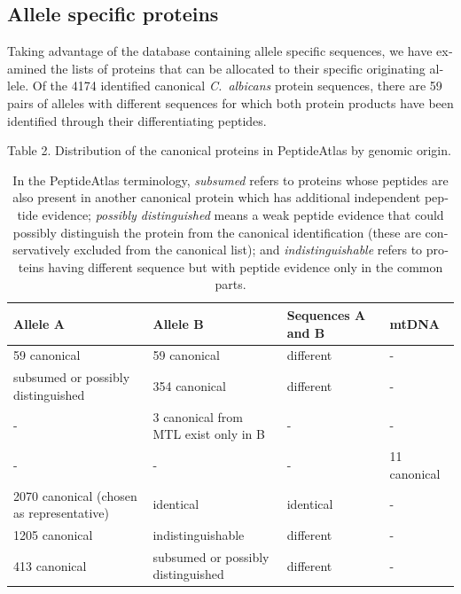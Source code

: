 \begin{otherlanguage}{british}
\subsection*{Allele specific proteins}

Taking advantage of the database containing allele specific sequences, we have examined
the lists of proteins that can be allocated to their specific originating allele.
Of the 4174 identified canonical \textit{\mbox{C. albicans}} protein sequences, there are 59 pairs of alleles
with different sequences for which both protein products have been identified through their
differentiating peptides.

\begin{table}[t]
\caption*{Table 2. Distribution of the canonical proteins in PeptideAtlas by genomic origin.}
\renewcommand{\arraystretch}{2}
\footnotesize
\centering
\begin{tabular}{p{2cm} p{2.5cm} p{2.5cm} p{2cm} }
\hline
Allele A  & Allele B & Sequences A and B & mtDNA \\
\hline
59 canonical & 59 canonical & different & -\\
subsumed or \newline possibly \mbox{distinguished} & 354 canonical & different & -\\
- & 3 canonical from MTL \newline exist only in B & - & -\\
- & - & - & 11 canonical \\
2070 canonical \newline (chosen as \newline \mbox{representative}) & identical & identical & - \\
1205 canonical & indistinguishable & different & - \\
413 canonical & subsumed or \newline possibly distinguished & different & - \\
\hline
\end{tabular}
\medskip
\caption*{In the
PeptideAtlas terminology, \emph{subsumed} refers to proteins whose peptides are also present in another
canonical protein which has additional independent peptide evidence; \emph{possibly distinguished}
means a weak peptide evidence that could possibly distinguish the protein from the canonical
identification (these are conservatively excluded from the canonical list); and \emph{indistinguishable}
refers to proteins having different sequence but with peptide evidence only in the common parts.}
\end{table}



\end{otherlanguage}
